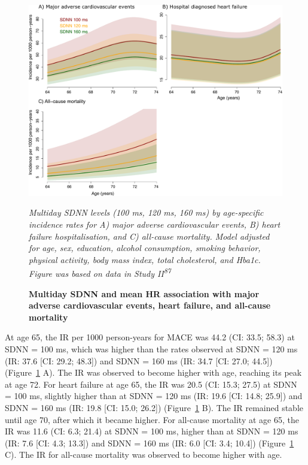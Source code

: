 \documentclass[
  a4paper,
  headsepline=true,
  open=any]{scrbook}
\begin{document}
\begin{figure}

{\centering 

\includegraphics{images/addition_pro_hrv_ir_mace.pdf}

\emph{Multiday SDNN levels (100 ms, 120 ms, 160 ms) by age-specific
incidence rates for A) major adverse cardiovascular events, B) heart
failure hospitalisation, and C) all-cause mortality. Model adjusted for
age, sex, education, alcohol consumption, smoking behavior, physical
activity, body mass index, total cholesterol, and Hba1c. Figure was
based on data in Study II\textsuperscript{87}}

}

\caption{\label{fig-addprohrv}\textbf{Multiday SDNN and mean HR
association with major adverse cardiovascular events, heart failure, and
all-cause mortality}}

\end{figure}

\restoregeometry

At age 65, the IR per 1000 person-years for MACE was 44.2 (CI: 33.5;
58.3) at SDNN = 100 ms, which was higher than the rates observed at SDNN
= 120 ms (IR: 37.6 {[}CI: 29.2; 48.3{]}) and SDNN = 160 ms (IR: 34.7
{[}CI: 27.0; 44.5{]}) (Figure~\ref{fig-addprohrv} A). The IR was
observed to become higher with age, reaching its peak at age 72. For
heart failure at age 65, the IR was 20.5 (CI: 15.3; 27.5) at SDNN = 100
ms, slightly higher than at SDNN = 120 ms (IR: 19.6 {[}CI: 14.8;
25.9{]}) and SDNN = 160 ms (IR: 19.8 {[}CI: 15.0; 26.2{]})
(Figure~\ref{fig-addprohrv} B). The IR remained stable until age 70,
after which it became higher. For all-cause mortality at age 65, the IR
was 11.6 (CI: 6.3; 21.4) at SDNN = 100 ms, higher than at SDNN = 120 ms
(IR: 7.6 {[}CI: 4.3; 13.3{]}) and SDNN = 160 ms (IR: 6.0 {[}CI: 3.4;
10.4{]}) (Figure~\ref{fig-addprohrv} C). The IR for all-cause mortality
was observed to become higher with age.
\end{document}
